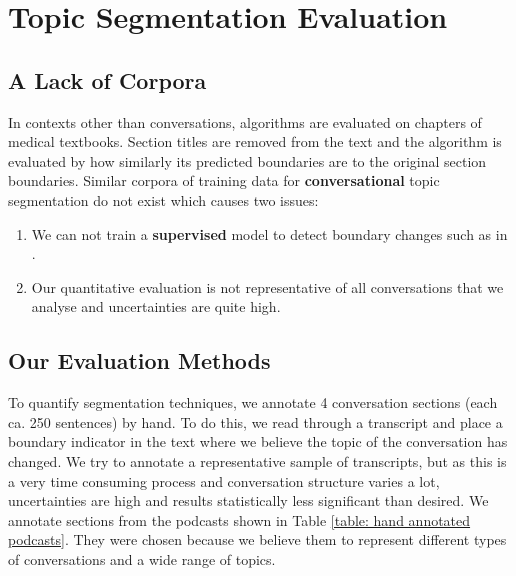 \section{Topic Segmentation Evaluation}
\subsection{A Lack of Corpora}
    In contexts other than conversations, algorithms are evaluated on chapters of medical textbooks\cite{eisenstein2008bayesian, simon2013leveraging}. Section titles are removed from the text and the algorithm is evaluated by how similarly its predicted boundaries are to the original section boundaries.
    Similar corpora of training data for \textbf{conversational} topic segmentation do not exist which causes two issues:
    \begin{enumerate}
        \item We can not train a \textbf{supervised} \gls{model} to detect boundary changes such as in \cite{joty2013topic}.
        \item Our quantitative evaluation is not representative of all conversations that we analyse and uncertainties are quite high.
    \end{enumerate}

\subsection{Our Evaluation Methods \label{method: segmentation evaluation}}

        To quantify segmentation techniques, we annotate 4 conversation sections (each ca. 250 sentences) by hand. To do this, we read through a transcript and place a boundary indicator in the text where we believe the topic of the conversation has changed. We try to annotate a representative sample of transcripts, but as this is a very time consuming process and conversation structure varies a lot, uncertainties are high and results statistically less significant than desired. We annotate sections from the podcasts shown in Table \ref{table: hand annotated podcasts}. They were chosen because we believe them to represent different types of conversations and a wide range of topics.

        \newcolumntype{B}{X}

